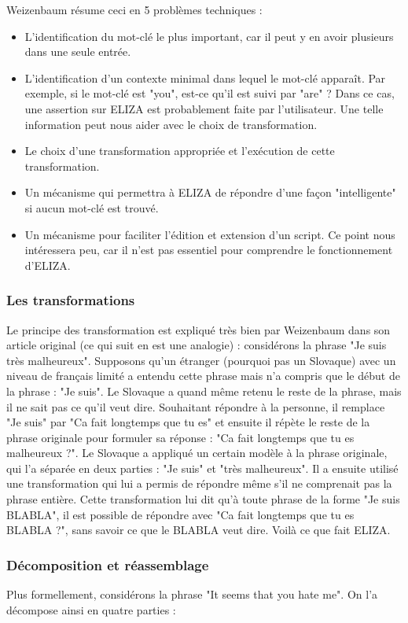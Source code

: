 \documentclass[11pt, a4paper]{report}
\begin{document}
Weizenbaum résume ceci en 5 problèmes techniques :
\begin{itemize}
  \item L'identification du mot-clé le plus important, car il peut y en avoir plusieurs dans une 
  seule entrée.
  \item L'identification d'un contexte minimal dans lequel le mot-clé apparaît. Par exemple, si le 
  mot-clé est "you", est-ce qu'il est suivi par "are" ? Dans ce cas, une assertion sur ELIZA est 
  probablement faite par l'utilisateur. Une telle information peut nous aider avec le choix de transformation.
  \item Le choix d'une transformation appropriée et l'exécution de cette transformation. 
  \item Un mécanisme qui permettra à ELIZA de répondre d'une façon "intelligente" si 
  aucun mot-clé est trouvé. 
  \item Un mécanisme pour faciliter l'édition et extension d'un script. Ce point nous intéressera peu, 
  car il n'est pas essentiel pour comprendre le fonctionnement d'ELIZA. 
\end{itemize}

      \subsubsection{Les transformations}
Le principe des transformation est expliqué très bien par Weizenbaum dans son article original (ce qui suit 
en est une analogie) : 
considérons la phrase "Je suis très malheureux". Supposons qu'un étranger (pourquoi pas un Slovaque) avec un niveau de 
français limité a entendu cette phrase mais n'a compris que le début de la phrase : "Je suis". 
Le Slovaque a quand même retenu le reste de la phrase, mais il ne sait pas ce qu'il veut dire. 
Souhaitant répondre à la personne, il remplace "Je suis" par "Ca fait longtemps que tu es"
et ensuite il répète le reste de la phrase originale pour formuler sa réponse :
"Ca fait longtemps que tu es malheureux ?". Le Slovaque a appliqué un certain modèle
à la phrase originale, qui l'a séparée en deux parties : "Je suis" et "très malheureux".
Il a ensuite utilisé une transformation qui lui a permis de répondre même s'il ne comprenait pas 
la phrase entière. Cette transformation lui dit qu'à toute phrase de la forme 
"Je suis BLABLA", il est possible de répondre avec "Ca fait longtemps que tu es BLABLA ?", 
sans savoir ce que le BLABLA veut dire. Voilà ce que fait ELIZA.  

      \subsubsection{Décomposition et réassemblage}
Plus formellement, considérons la phrase "It seems that you hate me". On l'a décompose ainsi
en quatre parties :
\end{document}
